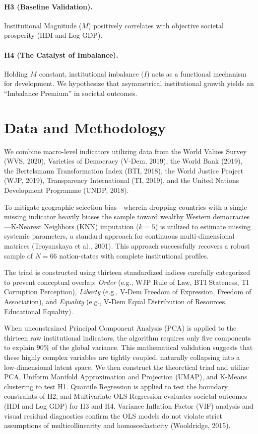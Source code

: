 \documentclass[12pt]{article}
\begin{document}
\paragraph{H3 (Baseline Validation).} 
Institutional Magnitude ($M$) positively correlates with objective societal prosperity (HDI and Log GDP).

\paragraph{H4 (The Catalyst of Imbalance).} 
Holding $M$ constant, institutional imbalance ($I$) acts as a functional mechanism for development. We hypothesize that asymmetrical institutional growth yields an ``Imbalance Premium'' in societal outcomes.

\section{Data and Methodology}

We combine macro-level indicators utilizing data from the World Values Survey (WVS, 2020), Varieties of Democracy (V-Dem, 2019), the World Bank (2019), the Bertelsmann Transformation Index (BTI, 2018), the World Justice Project (WJP, 2019), Transparency International (TI, 2019), and the United Nations Development Programme (UNDP, 2018). 

To mitigate geographic selection bias—wherein dropping countries with a single missing indicator heavily biases the sample toward wealthy Western democracies—K-Nearest Neighbors (KNN) imputation ($k=5$) is utilized to estimate missing systemic parameters, a standard approach for continuous multi-dimensional matrices (Troyanskaya et al., 2001). This approach successfully recovers a robust sample of $N=66$ nation-states with complete institutional profiles.

The triad is constructed using thirteen standardized indices carefully categorized to prevent conceptual overlap: \textit{Order} (e.g., WJP Rule of Law, BTI Stateness, TI Corruption Perception), \textit{Liberty} (e.g., V-Dem Freedom of Expression, Freedom of Association), and \textit{Equality} (e.g., V-Dem Equal Distribution of Resources, Educational Equality).

When unconstrained Principal Component Analysis (PCA) is applied to the thirteen raw institutional indicators, the algorithm requires only five components to explain 90\% of the global variance. This mathematical validation suggests that these highly complex variables are tightly coupled, naturally collapsing into a low-dimensional latent space. We then construct the theoretical triad and utilize PCA, Uniform Manifold Approximation and Projection (UMAP), and K-Means clustering to test H1. Quantile Regression is applied to test the boundary constraints of H2, and Multivariate OLS Regression evaluates societal outcomes (HDI and Log GDP) for H3 and H4. Variance Inflation Factor (VIF) analysis and visual residual diagnostics confirm the OLS models do not violate strict assumptions of multicollinearity and homoscedasticity (Wooldridge, 2015).
\end{document}
